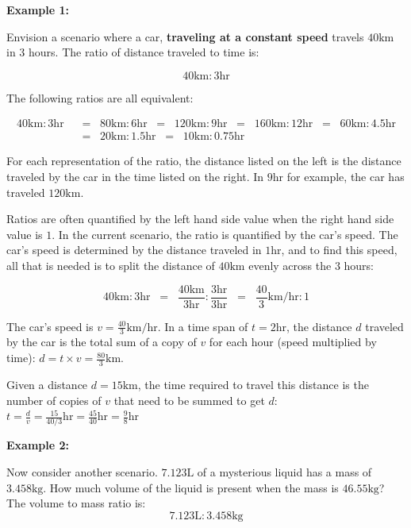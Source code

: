 \documentclass{article}
\begin{document}
\textbf{Example 1:}

Envision a scenario where a car, {\bf traveling at a constant speed} travels \(40\text{km}\) in \(3\) hours. The ratio of distance traveled to time is:

\[40\text{km} : 3\text{hr}\]   

The following ratios are all equivalent:

\begin{align*}
40\text{km} : 3\text{hr} 
& \;\;=\;\; 80\text{km} : 6\text{hr} 
\;\;=\;\; 120\text{km} : 9\text{hr} 
\;\;=\;\; 160\text{km} : 12\text{hr} 
\;\;=\;\; 60\text{km} : 4.5\text{hr} \\
& \;\;=\;\; 20\text{km} : 1.5\text{hr} 
\;\;=\;\; 10\text{km} : 0.75\text{hr} 
\end{align*}

For each representation of the ratio, the distance listed on the left is the distance traveled by the car in the time listed on the right. In \(9\text{hr}\) for example, the car has traveled \(120\text{km}\).  

Ratios are often quantified by the left hand side value when the right hand side value is \(1\). In the current scenario, the ratio is quantified by the car's speed. The car's speed is determined by the distance traveled in \(1\text{hr}\), and to find this speed, all that is needed is to split the distance of \(40\text{km}\) evenly across the \(3\) hours:

 \[40\text{km} : 3\text{hr} \;\; = \;\; \frac{40\text{km}}{3\text{hr}} : \frac{3\text{hr}}{3\text{hr}} \;\; = \;\; \frac{40}{3}\text{km/hr} : 1\] 

The car's speed is \(v = \frac{40}{3}\text{km/hr}\). In a time span of \(t = 2\text{hr}\), the distance \(d\) traveled by the car is the total sum of a copy of \(v\) for each hour (speed multiplied by time): \(d = t \times v = \frac{80}{3}\text{km}\). 

Given a distance \(d = 15\text{km}\), the time required to travel this distance is the number of copies of \(v\) that need to be summed to get \(d\): \(t = \frac{d}{v} = \frac{15}{40/3}\text{hr} = \frac{45}{40}\text{hr} = \frac{9}{8}\text{hr}\) 

\vspace{5mm}

\textbf{Example 2:}

Now consider another scenario. \(7.123\text{L}\) of a mysterious liquid has a mass of \(3.458\text{kg}\). How much volume of the liquid is present when the mass is \(46.55\text{kg}\)? The volume to mass ratio is:
\[7.123\text{L} : 3.458\text{kg}\]
\end{document}
